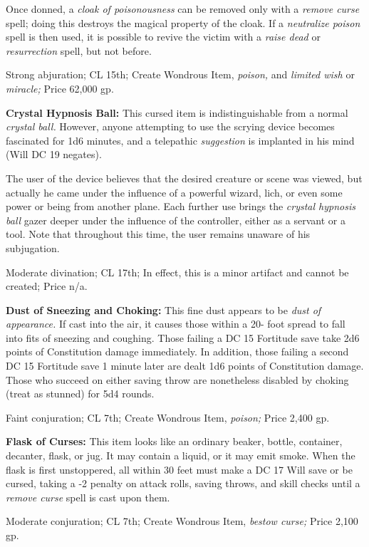 Once donned, a \textit{cloak of poisonousness }can be removed only with a \textit{remove 
curse }spell; doing this destroys the magical property of the cloak. If a \textit{neutralize 
poison }spell is then used, it is possible to revive the victim with a \textit{raise 
dead }or \textit{resurrection }spell, but not before.

Strong abjuration; CL 15th; Create Wondrous Item, \textit{poison, }and \textit{limited 
wish }or \textit{miracle; }Price 62,000 gp.

\textbf{Crystal Hypnosis Ball:} This cursed item is indistinguishable from a normal 
\textit{crystal ball. }However, anyone attempting to use the scrying device becomes 
fascinated for 1d6 minutes, and a telepathic \textit{suggestion }is implanted in 
his mind (Will DC 19 negates).

The user of the device believes that the desired creature or scene was viewed, 
but actually he came under the influence of a powerful wizard, lich, or even some 
power or being from another plane. Each further use brings the \textit{crystal 
hypnosis ball }gazer deeper under the influence of the controller, either as a 
servant or a tool. Note that throughout this time, the user remains unaware of 
his subjugation.

Moderate divination; CL 17th; In effect, this is a minor artifact and cannot be 
created; Price n/a.

\textbf{Dust of Sneezing and Choking:} This fine dust appears to be \textit{dust 
of appearance. }If cast into the air, it causes those within a 20- foot spread 
to fall into fits of sneezing and coughing. Those failing a DC 15 Fortitude save 
take 2d6 points of Constitution damage immediately. In addition, those failing 
a second DC 15 Fortitude save 1 minute later are dealt 1d6 points of Constitution 
damage. Those who succeed on either saving throw are nonetheless disabled by choking 
(treat as stunned) for 5d4 rounds.

Faint conjuration; CL 7th; Create Wondrous Item, \textit{poison; }Price 2,400 gp.

\textbf{Flask of Curses:} This item looks like an ordinary beaker, bottle, container, 
decanter, flask, or jug. It may contain a liquid, or it may emit smoke. When the 
flask is first unstoppered, all within 30 feet must make a DC 17 Will save or be 
cursed, taking a -2 penalty on attack rolls, saving throws, and skill checks until 
a \textit{remove curse }spell is cast upon them.

Moderate conjuration; CL 7th; Create Wondrous Item, \textit{bestow curse; }Price 
2,100 gp.

